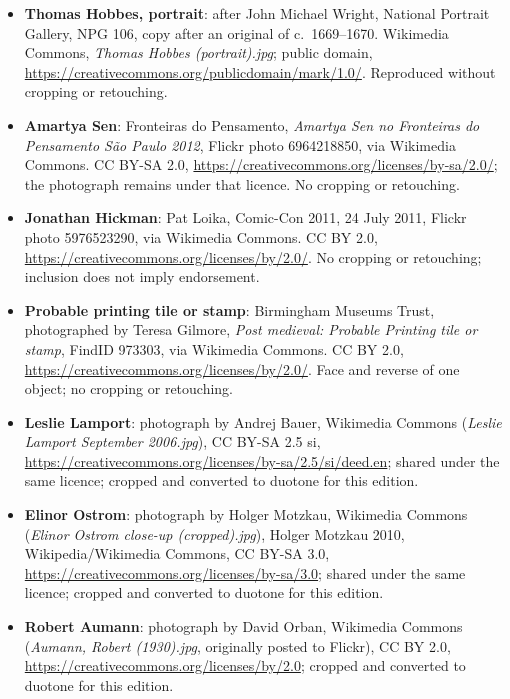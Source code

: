 \begin{itemize}\setlength{\itemsep}{0.4em}

\item \textbf{Thomas Hobbes, portrait}: after John Michael Wright,
  National Portrait Gallery, NPG 106, copy after an original of c.\ 1669--1670.
  Wikimedia Commons, \emph{Thomas Hobbes (portrait).jpg}; public domain,
  \url{https://creativecommons.org/publicdomain/mark/1.0/}.
  Reproduced without cropping or retouching.

\item \textbf{Amartya Sen}: Fronteiras do Pensamento,
  \emph{Amartya Sen no Fronteiras do Pensamento S\~ao Paulo 2012},
  Flickr photo 6964218850, via Wikimedia Commons. CC BY-SA 2.0,
  \url{https://creativecommons.org/licenses/by-sa/2.0/}; the photograph
  remains under that licence. No cropping or retouching.

\item \textbf{Jonathan Hickman}: Pat Loika, Comic-Con 2011,
  24 July 2011, Flickr photo 5976523290, via Wikimedia Commons.
  CC BY 2.0, \url{https://creativecommons.org/licenses/by/2.0/}.
  No cropping or retouching; inclusion does not imply endorsement.

\item \textbf{Probable printing tile or stamp}: Birmingham Museums Trust,
  photographed by Teresa Gilmore, \emph{Post medieval: Probable Printing tile
  or stamp}, FindID 973303, via Wikimedia Commons.
  CC BY 2.0, \url{https://creativecommons.org/licenses/by/2.0/}.
  Face and reverse of one object; no cropping or retouching.

\item \textbf{Leslie Lamport}: photograph by Andrej Bauer, Wikimedia Commons
  (\emph{Leslie Lamport September 2006.jpg}), CC BY-SA 2.5 si,
  \url{https://creativecommons.org/licenses/by-sa/2.5/si/deed.en}; shared
  under the same licence; cropped and converted to duotone for this edition.

\item \textbf{Elinor Ostrom}: photograph by Holger Motzkau, Wikimedia Commons
  (\emph{Elinor Ostrom close-up (cropped).jpg}), \textcopyright{} Holger
  Motzkau 2010, Wikipedia/Wikimedia Commons, CC BY-SA 3.0,
  \url{https://creativecommons.org/licenses/by-sa/3.0}; shared under the same
  licence; cropped and converted to duotone for this edition.

\item \textbf{Robert Aumann}: photograph by David Orban, Wikimedia Commons
  (\emph{Aumann, Robert (1930).jpg}, originally posted to Flickr), CC BY 2.0,
  \url{https://creativecommons.org/licenses/by/2.0}; cropped and converted to
  duotone for this edition.


\end{itemize}
